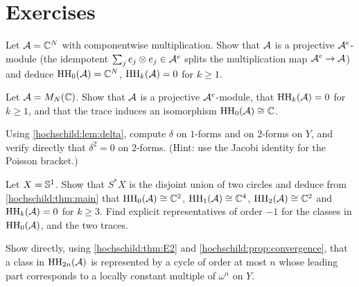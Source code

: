 \section{Exercises}

\begin{exercise}\label{hochschild:ex:diagonal}
Let $\mathcal{A}=\mathbb{C}^N$ with componentwise multiplication. Show that $\mathcal{A}$ is a
projective $\mathcal{A}^e$-module (the idempotent $\sum_je_j\otimes e_j\in\mathcal{A}^e$
splits the multiplication map $\mathcal{A}^e\to\mathcal{A}$) and deduce $\operatorname{HH}_0(\mathcal{A})=\mathbb{C}^N$,
$\operatorname{HH}_k(\mathcal{A})=0$ for $k\ge1$.
\end{exercise}

\begin{exercise}\label{hochschild:ex:matrices}
Let $\mathcal{A}=M_N(\mathbb{C})$. Show that $\mathcal{A}$ is a projective $\mathcal{A}^e$-module, that
$\operatorname{HH}_k(\mathcal{A})=0$ for $k\ge1$, and that the trace induces an isomorphism
$\operatorname{HH}_0(\mathcal{A})\cong\mathbb{C}$.
\end{exercise}

\begin{exercise}\label{hochschild:ex:delta-low}
Using \cref{hochschild:lem:delta}, compute $\delta$ on $1$-forms and on
$2$-forms on $Y$, and verify directly that $\delta^2=0$ on $2$-forms. (Hint:
use the Jacobi identity for the Poisson bracket.)
\end{exercise}

\begin{exercise}\label{hochschild:ex:circle}
Let $X=\mathbb{S}^1$. Show that $S^*X$ is the disjoint union of two circles and
deduce from \cref{hochschild:thm:main} that $\operatorname{HH}_0(\mathcal{A})\cong\mathbb{C}^2$,
$\operatorname{HH}_1(\mathcal{A})\cong\mathbb{C}^4$, $\operatorname{HH}_2(\mathcal{A})\cong\mathbb{C}^2$ and $\operatorname{HH}_k(\mathcal{A})=0$ for $k\ge3$.
Find explicit representatives of order $-1$ for the classes in
$\operatorname{HH}_0(\mathcal{A})$, and the two traces.
\end{exercise}

\begin{exercise}\label{hochschild:ex:top}
Show directly, using \cref{hochschild:thm:E2} and
\cref{hochschild:prop:convergence}, that a class in $\operatorname{HH}_{2n}(\mathcal{A})$ is
represented by a cycle of order at most $n$ whose leading part corresponds to
a locally constant multiple of $\omega^n$ on $Y$.
\end{exercise}

